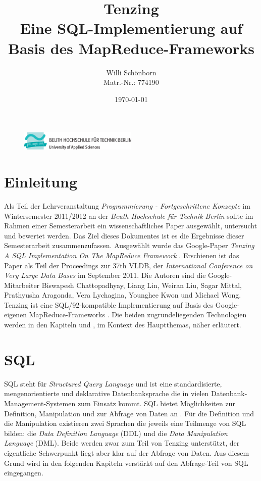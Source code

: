 \documentclass[a4paper]{article}
\title{Tenzing \\ Eine SQL-Implementierung auf Basis des MapReduce-Frameworks}
\author{Willi Schönborn \\  Matr.-Nr.: 774190}
\date{\today}
\begin{document}
\begin{figure}[H]
\centering
\includegraphics[width=0.5\textwidth]{beuth.eps}
\maketitle
\end{figure}

\newpage
\tableofcontents

\newpage
\section{Einleitung}
Als Teil der Lehrveranstaltung \textit{Programmierung - Fortgeschrittene Konzepte} im Wintersemester 2011/2012 an der \textit{Beuth Hochschule für Technik Berlin} sollte im Rahmen einer Semesterarbeit ein wissenschaftliches Paper ausgewählt, untersucht und bewertet werden. Das Ziel dieses Dokumentes ist es die Ergebnisse dieser Semesterarbeit zusammenzufassen. Ausgewählt wurde das Google-Paper \textit{Tenzing A SQL Implementation On The MapReduce Framework} \cite{TENZING}. Erschienen ist das Paper als Teil der Proceedings zur 37th VLDB, der \textit{International Conference on Very Large Data Bases} im September 2011. Die Autoren sind die Google-Mitarbeiter Biswapesh Chattopadhyay, Liang Lin, Weiran Liu, Sagar Mittal, Prathyusha Aragonda, Vera Lychagina, Younghee Kwon und Michael Wong. Tenzing ist eine SQL/92-kompatible Implementierung auf Basis des Google-eigenen MapReduce-Frameworks \cite{MAPREDUCE}. Die beiden zugrundeliegenden Technologien werden in den Kapiteln  und , im Kontext des Hauptthemas, näher erläutert.

\newpage
\section{SQL}
\label{sql}
SQL steht für \textit{Structured Query Language} und ist eine standardisierte, mengenorientierte und deklarative Datenbanksprache die in vielen Datenbank-Management-Systemen zum Einsatz kommt. SQL bietet Möglichkeiten zur Definition, Manipulation und zur Abfrage von Daten an \cite{Codd}. Für die Definition und die Manipulation existieren zwei Sprachen die jeweils eine Teilmenge von SQL bilden: die \textit{Data Definition Language} (DDL) und die \textit{Data Manipulation Language} (DML). Beide werden zwar zum Teil von Tenzing unterstützt, der eigentliche Schwerpunkt liegt aber klar auf der Abfrage von Daten. Aus diesem Grund wird in den folgenden Kapiteln verstärkt auf den Abfrage-Teil von SQL eingegangen.
\end{document}
